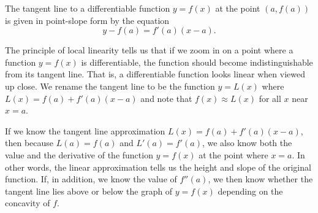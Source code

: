 
\clearpage

\begin{summary}
\item The tangent line to a differentiable function $y = f(x)$ at the point $(a,f(a))$ is given in point-slope form by the equation
$$y - f(a) = f'(a)(x-a).$$
\item The principle of local linearity tells us that if we zoom in on a point where a function $y = f(x)$ is differentiable, the function should become indistinguishable from its tangent line.  That is, a differentiable function looks linear when viewed up close.  We rename the tangent line to be the function $y = L(x)$ where $L(x) = f(a) + f'(a)(x-a)$ and note that $f(x) \approx L(x)$ for all $x$ near $x = a$.
\item If we know the tangent line approximation $L(x) = f(a) + f'(a)(x-a)$, then because $L(a) = f(a)$ and $L'(a) = f'(a)$, we also know both the value and the derivative of the function $y = f(x)$ at the point where $x = a$.  In other words, the linear approximation tells us the height and slope of the original function.  If, in addition, we know the value of $f''(a)$, we then know whether the tangent line lies above or below the graph of $y = f(x)$ depending on the concavity of $f$.
\end{summary}

\clearpage

 

\cleardoublepage